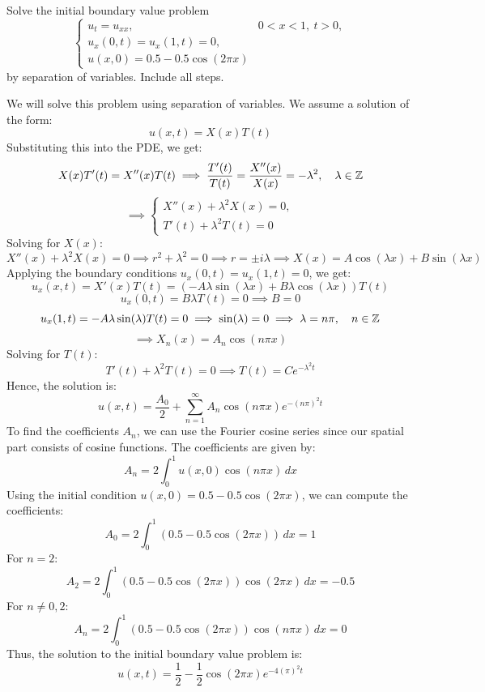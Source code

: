 \documentclass[12pt]{article}
\begin{document}
Solve the initial boundary value problem
\[
\begin{cases}
u_t = u_{xx}, & 0 < x < 1,\ t > 0, \\
u_x(0,t) = u_x(1,t) = 0, \\
u(x,0) = 0.5 - 0.5\cos(2\pi x)
\end{cases}
\]
by separation of variables. Include all steps.

\sol
We will solve this problem using separation of variables. We assume a solution of the form:
\[
u(x,t) = X(x)T(t)
\]
Substituting this into the PDE, we get:
\[
X(x)T'(t) = X''(x)T(t)
\implies \frac{T'(t)}{T(t)} = \frac{X''(x)}{X(x)} = -\lambda^2, \quad \lambda \in \mathbb{Z}
\]
\[
\implies
\begin{cases}
X''(x) + \lambda^2 X(x) = 0, \\
T'(t) + \lambda^2 T(t) = 0
\end{cases}
\]
Solving for $X(x)$:
\[
X''(x) + \lambda^2 X(x) = 0
\implies r^2 + \lambda^2 = 0
\implies r = \pm i\lambda
\implies X(x) = A\cos(\lambda x) + B\sin(\lambda x)
\]
Applying the boundary conditions $u_x(0,t) = u_x(1,t) = 0$, we get:
\[
u_x(x,t) = X'(x)T(t) = (-A\lambda \sin(\lambda x) + B\lambda \cos(\lambda x))T(t)
\]
\[
u_x(0,t) = B\lambda T(t) = 0 \implies B = 0
\]
\[
u_x(1,t) = -A\lambda \sin(\lambda) T(t) = 0 \implies \sin(\lambda) = 0 \implies \lambda = n\pi, \quad n \in \mathbb{Z}
\]
\[
\implies X_n(x) = A_n \cos(n\pi x)
\]
Solving for $T(t)$:
\[
T'(t) + \lambda^2 T(t) = 0
\implies T(t) = Ce^{-\lambda^2 t}
\]
Hence, the solution is:
\[
u(x,t) = \frac{A_0}{2} + \sum_{n=1}^{\infty} A_n \cos(n\pi x) e^{-(n\pi)^2 t}
\]
To find the coefficients $A_n$, we can use the Fourier cosine series since our spatial part consists of cosine functions. The coefficients are given by:
\[
A_n = 2 \int_0^1 u(x,0) \cos(n\pi x)\, dx
\]
Using the initial condition $u(x,0) = 0.5 - 0.5\cos(2\pi x)$, we can compute the coefficients:
\[
A_0 = 2 \int_0^1 (0.5 - 0.5\cos(2\pi x))\, dx = 1
\]
For $n=2$:
\[
A_2 = 2 \int_0^1 (0.5 - 0.5\cos(2\pi x)) \cos(2\pi x)\, dx = -0.5
\]
For $n \neq 0, 2$:
\[
A_n = 2 \int_0^1 (0.5 - 0.5\cos(2\pi x)) \cos(n\pi x)\, dx = 0
\]
Thus, the solution to the initial boundary value problem is:
\[
\boxed{
u(x,t) = \frac{1}{2} - \frac{1}{2} \cos(2\pi x) e^{-4(\pi)^2 t}
}
\]
\end{document}
